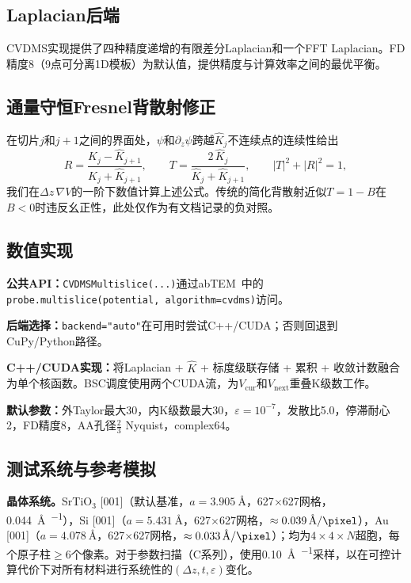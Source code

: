 \documentclass[twoside,11pt]{ctexart}
\begin{document}
\subsection{Laplacian后端}\label{sec:laplacian}

CVDMS实现提供了四种精度递增的有限差分Laplacian和一个FFT Laplacian。FD精度8（9点可分离1D模板）为默认值，提供精度与计算效率之间的最优平衡。


\subsection{通量守恒Fresnel背散射修正}\label{sec:bsc}

在切片$j$和$j+1$之间的界面处，$\psi$和$\partial_z\psi$跨越$\hat{K}_j$不连续点的连续性给出
\begin{equation}\label{eq:fresnel-bsc}
R=\frac{\hat{K}_j-\hat{K}_{j+1}}{\hat{K}_j+\hat{K}_{j+1}},\qquad
T=\frac{2\,\hat{K}_j}{\hat{K}_j+\hat{K}_{j+1}},\qquad
|T|^2+|R|^2=1,
\end{equation}
我们在$\Delta z\,\nabla V$的一阶下数值计算上述公式。传统的简化背散射近似$T=1-B$在$B<0$时违反幺正性，此处仅作为有文档记录的负对照。

\subsection{数值实现}

\textbf{公共API：}{\tt CVDMSMultislice(...)}通过abTEM~\cite{MadsenSusi2021}中的{\tt probe.multislice(potential, algorithm=cvdms)}访问。

\textbf{后端选择：}{\tt backend="auto"}在可用时尝试C++/CUDA；否则回退到CuPy/Python路径。

\textbf{C++/CUDA实现：}将Laplacian + $\hat{K}$ + 标度级联存储 + 累积 + 收敛计数融合为单个核函数。BSC调度使用两个CUDA流，为$V_\text{cur}$和$V_\text{next}$重叠K级数工作。

\textbf{默认参数：}外Taylor最大30，内K级数最大30，$\varepsilon=10^{-7}$，发散比5.0，停滞耐心2，FD精度8，AA孔径$\tfrac23$ Nyquist，complex64。

\subsection{测试系统与参考模拟}\label{sec:test-systems}

\textbf{晶体系统。}SrTiO$_3$ [001]（默认基准，$a=\SI{3.905}{\angstrom}$，627$\times$627网格，\SI{0.044}{\angstrom\per\pixel}），Si [001]（$a=\SI{5.431}{\angstrom}$，627$\times$627网格，$\approx\SI{0.039}{\angstrom\per\pixel}$），Au [001]（$a=\SI{4.078}{\angstrom}$，627$\times$627网格，$\approx\SI{0.033}{\angstrom\per\pixel}$）；均为$4\times4\times N$超胞，每个原子柱$\ge6$个像素。对于参数扫描（C系列），使用\SI{0.10}{\angstrom\per\pixel}采样，以在可控计算代价下对所有材料进行系统性的$(\Delta z, t, \varepsilon)$变化。
\end{document}
